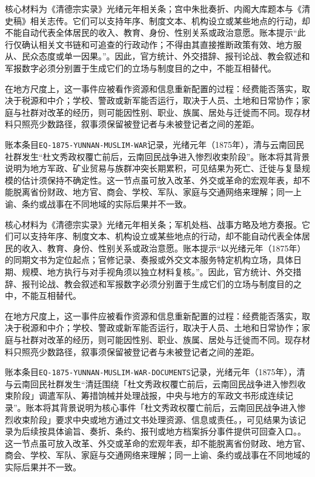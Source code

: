 核心材料为《清德宗实录》光绪元年相关条；宫中朱批奏折、内阁大库题本与《清史稿》相关志传。它们可以支持年序、制度文本、机构设立或某些地点的行动，却不能自动代表全体居民的收入、教育、身份、性别关系或政治意愿。账本提示“此行仅确认相关文书链和可追查的行政动作；不得由其直接推断政策有效、地方服从、民众态度或单一因果。”。因此，官方统计、外交措辞、报刊论战、教会叙述和军报数字必须分别置于生成它们的立场与制度目的之中，不能互相替代。

在地方尺度上，这一事件应被看作资源和信息重新配置的过程：经费能否落实，取决于税源和中介；学校、警政或新军能否运行，取决于人员、土地和日常协作；家庭与社群对改革的经历，则可能因性别、职业、族属、居处与迁徙而不同。现存材料只照亮少数路径，叙事须保留被登记者与未被登记者之间的差距。

账本条目\texttt{EQ-1875-YUNNAN-MUSLIM-WAR}记录，光绪元年（1875年），清与云南回民社群发生“杜文秀政权覆亡前后，云南回民战争进入惨烈收束阶段”。账本将其背景说明为地方军政、矿业贸易与族群冲突长期累积，可见结果为死亡、迁徙与复垦规模的估计须保持不确定性。这一节点虽可放入改革、外交或革命的宏观年表，却不能脱离省份财政、地方官、商会、学校、军队、家庭与交通网络来理解；同一上谕、条约或战事在不同地域的实际后果并不一致。

核心材料为《清德宗实录》光绪元年相关条；军机处档、战事方略及地方奏报。它们可以支持年序、制度文本、机构设立或某些地点的行动，却不能自动代表全体居民的收入、教育、身份、性别关系或政治意愿。账本提示“以光绪元年（1875年）的同期文书为定位起点；官修记录、奏报或外交文本服务特定机构立场，具体日期、规模、地方执行与对手视角须以独立材料复核。”。因此，官方统计、外交措辞、报刊论战、教会叙述和军报数字必须分别置于生成它们的立场与制度目的之中，不能互相替代。

在地方尺度上，这一事件应被看作资源和信息重新配置的过程：经费能否落实，取决于税源和中介；学校、警政或新军能否运行，取决于人员、土地和日常协作；家庭与社群对改革的经历，则可能因性别、职业、族属、居处与迁徙而不同。现存材料只照亮少数路径，叙事须保留被登记者与未被登记者之间的差距。

账本条目\texttt{EQ-1875-YUNNAN-MUSLIM-WAR-DOCUMENTS}记录，光绪元年（1875年），清与云南回民社群发生“清廷围绕「杜文秀政权覆亡前后，云南回民战争进入惨烈收束阶段」调遣军队、筹措饷械并处理战报，中央与地方的军政文书形成连续记录”。账本将其背景说明为核心事件「杜文秀政权覆亡前后，云南回民战争进入惨烈收束阶段」要求中央或地方通过文书处理资源、信息或责任。，可见结果为该记录为后续按具体谕旨、奏折、条约、报刊或地方档案拆分事件提供可回查入口。。这一节点虽可放入改革、外交或革命的宏观年表，却不能脱离省份财政、地方官、商会、学校、军队、家庭与交通网络来理解；同一上谕、条约或战事在不同地域的实际后果并不一致。

